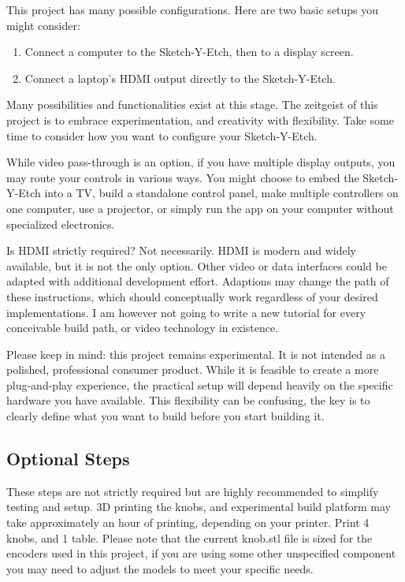 \documentclass[]{article}
\begin{document}
This project has many possible configurations. Here are two basic setups you might consider:

\begin{enumerate}
	\item Connect a computer to the Sketch-Y-Etch, then to a display screen.
	\item Connect a laptop's HDMI output directly to the Sketch-Y-Etch.
\end{enumerate}

Many possibilities and functionalities exist at this stage. The zeitgeist of this project is to embrace experimentation, and creativity with flexibility. Take some time to consider how you want to configure your Sketch-Y-Etch.

While video pass-through is an option, if you have multiple display outputs, you may route your controls in various ways. You might choose to embed the Sketch-Y-Etch into a TV, build a standalone control panel, make multiple controllers on one computer, use a projector, or simply run the app on your computer without specialized electronics.

Is HDMI strictly required? Not necessarily. HDMI is modern and widely available, but it is not the only option. Other video or data interfaces could be adapted with additional development effort. Adaptions may change the path of these instructions, which should conceptually work regardless of your desired implementations. I am however not going to write a new tutorial for every conceivable build path, or video technology in existence. 

Please keep in mind: this project remains experimental. It is not intended as a polished, professional consumer product.  
While it is feasible to create a more plug-and-play experience, the practical setup will depend heavily on the specific hardware you have available.
This flexibility can be confusing, the key is to clearly define what you want to build before you start building it.

\subsection*{Optional Steps}

These steps are not strictly required but are highly recommended to simplify testing and setup. 3D printing the knobs, and experimental build platform may take approximately an hour of printing, depending on your printer. Print 4 knobs, and 1 table. Please note that the current knob.stl file is sized for the encoders used in this project, if you are using some other unspecified component you may need to adjust the models to meet your specific needs. 
\end{document}
